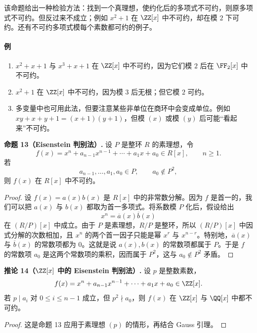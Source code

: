 该命题给出一种检验方法：找到一个真理想，使约化后的多项式不可约，则原多项式不可约。但反过来不成立；例如 $x^2+1$ 在 $\ZZ[x]$ 中不可约，却在模 $2$ 下可约。还有不可约多项式模每个素数都可约的例子。

\paragraph{例}
\begin{enumerate}[label=(\arabic*)]
	\item $x^2+x+1$ 与 $x^3+x+1$ 在 $\ZZ[x]$ 中不可约，因为它们模 $2$ 后在 $\FF_2[x]$ 中不可约。
	\item $x^2+1$ 在 $\ZZ[x]$ 中不可约，因为模 $3$ 后无根；但它模 $2$ 可约。
	\item 多变量中也可用此法，但要注意某些非单位在商环中会变成单位。例如 $xy+x+y+1=(x+1)(y+1)$，但模 $(x)$ 或模 $(y)$ 后可能“看起来”不可约。
\end{enumerate}

\noindent\textbf{命题 13（Eisenstein 判别法）.} 设 $P$ 是整环 $R$ 的素理想，令
\[
f(x)=x^n+a_{n-1}x^{n-1}+\cdots+a_1x+a_0\in R[x],\qquad n\geq1.
\]
若
\[
a_{n-1},\ldots,a_1,a_0\in P,
\qquad a_0\notin P^2,
\]
则 $f(x)$ 在 $R[x]$ 中不可约。

\begin{proof}
	设 $f(x)=a(x)b(x)$ 是 $R[x]$ 中的非常数分解。因为 $f$ 是首一的，我们可以把 $a(x)$ 与 $b(x)$ 都取为首一多项式。将系数模 $P$ 化后，假设给出
	\[
	x^n=\overline{a}(x)\overline{b}(x)
	\]
	在 $(R/P)[x]$ 中成立。由于 $P$ 是素理想，$R/P$ 是整环，所以 $(R/P)[x]$ 中因式分解的次数相加，且 $x^n$ 的两个首一因子只能是幂 $x^r$ 与 $x^{n-r}$。特别地，$\overline{a}(x)$ 与 $\overline{b}(x)$ 的常数项都为 $0$。这就是说 $a(x),b(x)$ 的常数项都属于 $P$。于是 $f$ 的常数项 $a_0$ 是这两个常数项的乘积，因而属于 $P^2$，这与 $a_0\notin P^2$ 矛盾。
\end{proof}

\noindent\textbf{推论 14（$\ZZ[x]$ 中的 Eisenstein 判别法）.} 设 $p$ 是整数素数，
\[
f(x)=x^n+a_{n-1}x^{n-1}+\cdots+a_1x+a_0\in\ZZ[x].
\]
若 $p\mid a_i$ 对 $0\leq i\leq n-1$ 成立，但 $p^2\nmid a_0$，则 $f(x)$ 在 $\ZZ[x]$ 与 $\QQ[x]$ 中都不可约。

\begin{proof}
	这是命题 13 应用于素理想 $(p)$ 的情形，再结合 Gauss 引理。
\end{proof}

